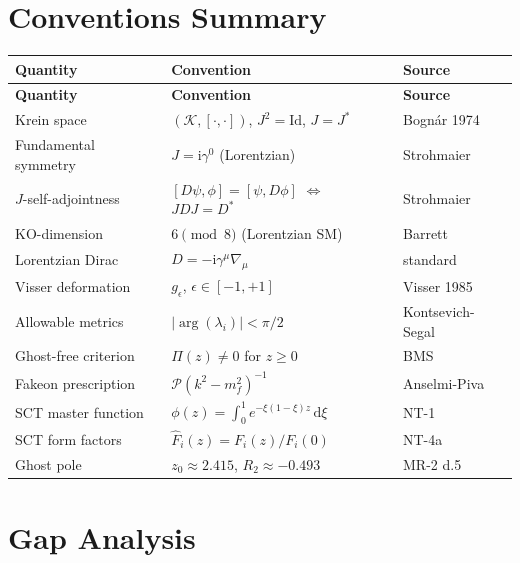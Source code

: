 \documentclass[12pt,a4paper]{article}
\theoremstyle{definition}
\theoremstyle{remark}
\newcommand{\dd}{\mathrm{d}}
\newcommand{\ii}{\mathrm{i}}
\newcommand{\Id}{\mathrm{Id}}
\newcommand{\PP}{\mathcal{P}}
\begin{document}
\section{Conventions Summary}
\label{sec:conventions}

\begin{center}
\small
\begin{longtable}{lll}
\toprule
\textbf{Quantity} & \textbf{Convention} & \textbf{Source} \\
\midrule
\endfirsthead
\toprule
\textbf{Quantity} & \textbf{Convention} & \textbf{Source} \\
\midrule
\endhead
\bottomrule
\endlastfoot
Krein space & $(\mathcal{K}, [\cdot,\cdot])$,
  $J^2 = \Id$, $J = J^*$
  & Bogn\'{a}r 1974 \\
Fundamental symmetry & $J = \ii\gamma^0$ (Lorentzian)
  & Strohmaier \\
$J$-self-adjointness & $[D\psi,\phi] = [\psi,D\phi]$
  $\Leftrightarrow$ $JDJ = D^*$
  & Strohmaier \\
KO-dimension & $6 \pmod{8}$ (Lorentzian SM)
  & Barrett \\
Lorentzian Dirac & $D = -\ii\gamma^\mu\nabla_\mu$
  & standard \\
Visser deformation & $g_\epsilon$,
  $\epsilon \in [-1,+1]$
  & Visser 1985 \\
Allowable metrics & $|\arg(\lambda_i)| < \pi/2$
  & Kontsevich-Segal \\
Ghost-free criterion & $\Pi(z) \neq 0$ for $z \geq 0$
  & BMS \\
Fakeon prescription & $\PP(k^2 - m_f^2)^{-1}$
  & Anselmi-Piva \\
SCT master function & $\phi(z) = \int_0^1 e^{-\xi(1-\xi)z}\,\dd\xi$
  & NT-1 \\
SCT form factors & $\hat{F}_i(z) = F_i(z)/F_i(0)$
  & NT-4a \\
Ghost pole & $z_0 \approx 2.415$,
  $R_2 \approx -0.493$
  & MR-2 d.5 \\
\end{longtable}
\end{center}


\section{Gap Analysis}
\label{sec:gaps}
\end{document}

